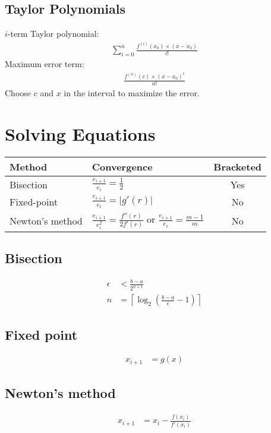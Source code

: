 \documentclass[12pt]{article}
\newcommand{\round}   [1]{\left(       #1 \right)}
\newcommand{\straight}[1]{\left|       #1 \right|}
\newcommand{\ceiling} [1]{\left\lceil  #1 \right\rceil}
\begin{document}
\subsection*{Taylor Polynomials}
$i$-term Taylor polynomial:
\begin{align*}
    \sum_{i=0}^n \frac{f^{(i)}(x_0) \times (x - x_0)}{i!}
\end{align*}
Maximum error term:
\begin{align*}
    \frac{f^{(n)}(c) \times (x - x_0)^i}{n!}
\end{align*}
Choose $c$ and $x$ in the interval to maximize the error.

\section*{Solving Equations}

\begin{center}
    \begin{tabular}{l|lc}
        Method & Convergence & Bracketed \\ \hline
        Bisection & $\frac{e_{i+1}}{e_i} = \frac{1}{2}$ & Yes \\
        Fixed-point & $\frac{e_{i+1}}{e_i} = \straight{g'(r)}$ & No \\
        Newton's method & $\frac{e_{i+1}}{e_i^2} = \frac{f''(r)}{2f'(r)}$ or $\frac{e_{i+1}}{e_i} = \frac{m - 1}{m}$ & No
    \end{tabular}
\end{center}

\subsection*{Bisection}
\begin{align*}
    \epsilon &< \frac{b - a}{2^{n + 1}} \\
    n &= \ceiling{\log_2 \round{\frac{b - a}{\epsilon} - 1}}
\end{align*}

\subsection*{Fixed point}
\begin{align*}
    x_{i + 1} &= g(x)
\end{align*}

\subsection*{Newton's method}
\begin{align*}
    x_{i + 1} &= x_i - \frac{f(x_i)}{f'(x_i)}
\end{align*}
\end{document}
